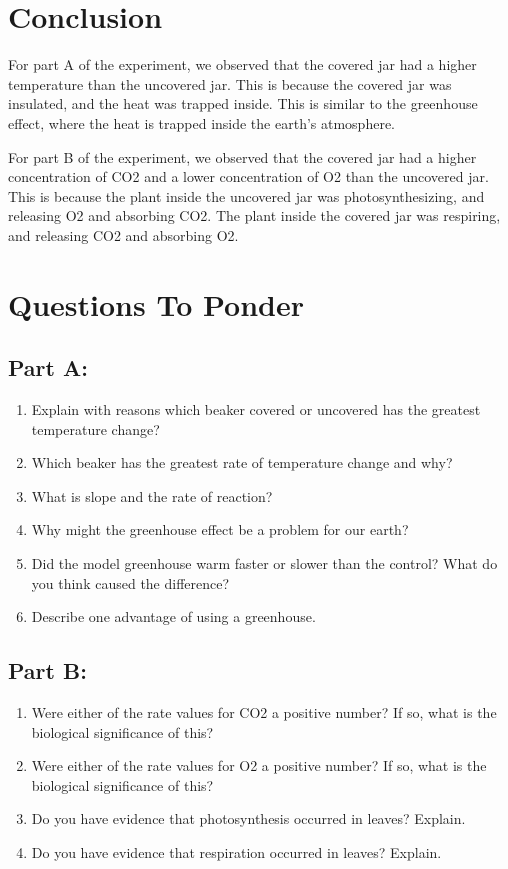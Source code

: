 \documentclass[a4paper, 12pt, english]{article}
\begin{document}
\section{Conclusion}
For part A of the experiment, we observed that the covered jar had a higher
temperature than the uncovered jar. This is because the covered jar was
insulated, and the heat was trapped inside. This is similar to the greenhouse
effect, where the heat is trapped inside the earth's atmosphere.

For part B of the experiment, we observed that the covered jar had a higher
concentration of CO2 and a lower concentration of O2 than the uncovered jar.
This is because the plant inside the uncovered jar was photosynthesizing, and
releasing O2 and absorbing CO2. The plant inside the covered jar was
respiring, and releasing CO2 and absorbing O2.

\section{Questions To Ponder}
\subsection{Part A:}

\begin{enumerate}
	\item Explain with reasons which beaker covered or uncovered has the greatest
	      temperature change?
	\item Which beaker has the greatest rate of temperature change and why?
	\item What is slope and the rate of reaction?
	\item Why might the greenhouse effect be a problem for our earth?
	\item Did the model greenhouse warm faster or slower than the control? What do you
	      think caused the difference?
	\item Describe one advantage of using a greenhouse.
\end{enumerate}

\subsection{Part B:}

\begin{enumerate}
	\item Were either of the rate values for CO2 a positive number? If so, what is the
	      biological significance of this?
	\item Were either of the rate values for O2 a positive number? If so, what is the
	      biological significance of this?
	\item Do you have evidence that photosynthesis occurred in leaves? Explain.
	\item Do you have evidence that respiration occurred in leaves? Explain.
\end{enumerate}
\end{document}

